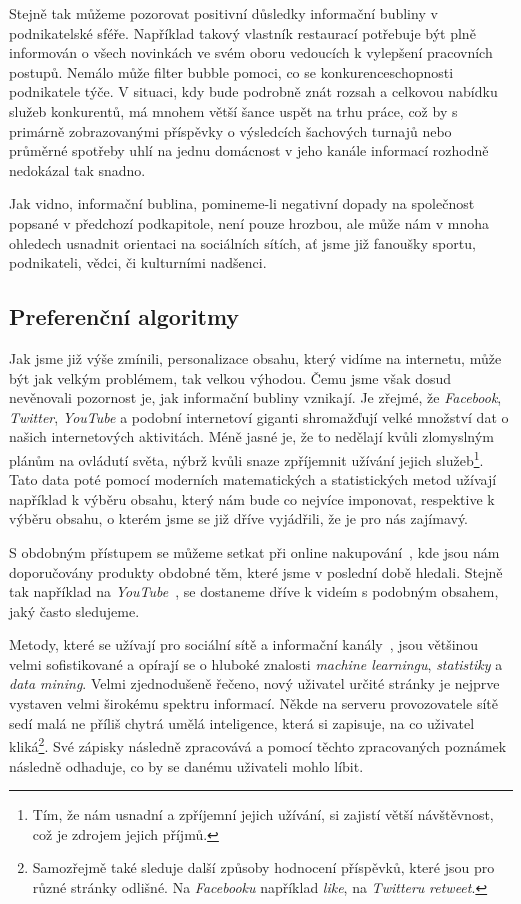 \documentclass[12pt, a4paper]{article}
\numberwithin{equation}{section} 	%
\begin{document}
Stejně tak můžeme pozorovat positivní důsledky informační bubliny v podnikatelské sféře. Například takový vlastník restaurací potřebuje být plně informován o všech novinkách ve svém oboru vedoucích k vylepšení pracovních postupů. Nemálo může filter bubble pomoci, co se konkurenceschopnosti podnikatele týče. V situaci, kdy bude podrobně znát rozsah a celkovou nabídku služeb konkurentů, má mnohem větší šance uspět na trhu práce, což by s primárně zobrazovanými příspěvky o výsledcích šachových turnajů nebo průměrné spotřeby uhlí na jednu domácnost v jeho kanále informací rozhodně nedokázal tak snadno.

Jak vidno, informační bublina, pomineme-li negativní dopady na společnost popsané v předchozí podkapitole, není pouze hrozbou, ale může nám v mnoha ohledech usnadnit orientaci na sociálních sítích, ať jsme již fanoušky sportu, podnikateli, vědci, či kulturními nadšenci.

\subsection{Preferenční algoritmy}
\noindent Jak jsme již výše zmínili, personalizace obsahu, který vidíme na internetu, může být jak velkým problémem, tak velkou výhodou. Čemu jsme však dosud nevěnovali pozornost je, jak informační bubliny vznikají. Je zřejmé, že \textit{Facebook}, \textit{Twitter}, \textit{YouTube} a podobní internetoví giganti shromažďují velké množství dat o našich internetových aktivitách. Méně jasné je, že to nedělají kvůli zlomyslným plánům na ovládutí světa, nýbrž kvůli snaze zpříjemnit užívání jejich služeb\footnote{Tím, že nám usnadní a zpříjemní jejich užívání, si zajistí větší návštěvnost, což je zdrojem jejich příjmů.}. Tato data poté pomocí moderních matematických a statistických metod užívají například k výběru obsahu, který nám bude co nejvíce imponovat, respektive k výběru obsahu, o kterém jsme se již dříve vyjádřili, že je pro nás zajímavý.

S obdobným přístupem se můžeme setkat při online nakupování~\cite{Amazon}, kde jsou nám doporučovány produkty obdobné těm, které jsme v poslední době hledali. Stejně tak například na \textit{YouTube}~\cite{YouTube}, se dostaneme dříve k videím s podobným obsahem, jaký často sledujeme.

Metody, které se užívají pro sociální sítě a informační kanály~\cite{TwitterRecomendation}, jsou většinou velmi sofistikované a opírají se o hluboké znalosti \textit{machine learningu}, \textit{statistiky} a \textit{data mining}. Velmi zjednodušeně řečeno, nový uživatel určité stránky je nejprve vystaven velmi širokému spektru informací. Někde na serveru provozovatele sítě sedí malá ne příliš chytrá umělá inteligence, která si zapisuje, na co uživatel kliká\footnote{Samozřejmě také sleduje další způsoby hodnocení příspěvků, které jsou pro různé stránky odlišné. Na \textit{Facebooku} například \textit{like}, na \textit{Twitteru} \textit{retweet}.}. Své zápisky následně zpracovává a pomocí těchto zpracovaných poznámek následně odhaduje, co by se danému uživateli mohlo líbit.
\end{document}
